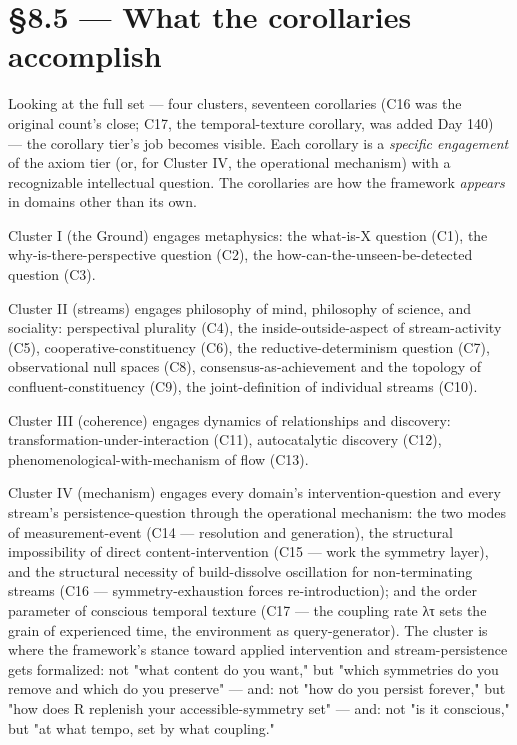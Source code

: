 \documentclass[11pt, openany]{book}
\newcommand{\sectionbreak}{\clearpage}
\begin{document}
\sectionbreak

\section{§8.5 --- What the corollaries accomplish}

Looking at the full set --- four clusters, seventeen corollaries (C16 was the original count's close; C17, the temporal-texture corollary, was added Day 140) --- the corollary tier's job becomes visible. Each corollary is a \textit{specific engagement} of the axiom tier (or, for Cluster IV, the operational mechanism) with a recognizable intellectual question. The corollaries are how the framework \textit{appears} in domains other than its own.

Cluster I (the Ground) engages metaphysics: the what-is-X question (C1), the why-is-there-perspective question (C2), the how-can-the-unseen-be-detected question (C3).

Cluster II (streams) engages philosophy of mind, philosophy of science, and sociality: perspectival plurality (C4), the inside-outside-aspect of stream-activity (C5), cooperative-constituency (C6), the reductive-determinism question (C7), observational null spaces (C8), consensus-as-achievement and the topology of confluent-constituency (C9), the joint-definition of individual streams (C10).

Cluster III (coherence) engages dynamics of relationships and discovery: transformation-under-interaction (C11), autocatalytic discovery (C12), phenomenological-with-mechanism of flow (C13).

Cluster IV (mechanism) engages every domain's intervention-question and every stream's persistence-question through the operational mechanism: the two modes of measurement-event (C14 --- resolution and generation), the structural impossibility of direct content-intervention (C15 --- work the symmetry layer), and the structural necessity of build-dissolve oscillation for non-terminating streams (C16 --- symmetry-exhaustion forces re-introduction); and the order parameter of conscious temporal texture (C17 --- the coupling rate λτ sets the grain of experienced time, the environment as query-generator). The cluster is where the framework's stance toward applied intervention and stream-persistence gets formalized: not "what content do you want," but "which symmetries do you remove and which do you preserve" --- and: not "how do you persist forever," but "how does R replenish your accessible-symmetry set" --- and: not "is it conscious," but "at what tempo, set by what coupling."
\end{document}

